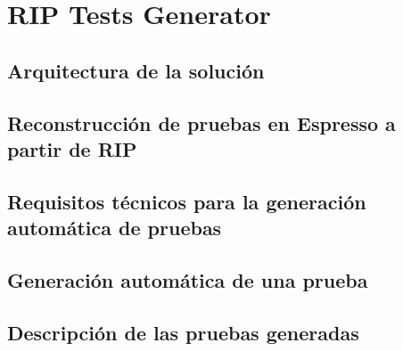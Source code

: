 \chapter{RIP Tests Generator}
\label{chapter3}

\section{Arquitectura de la solución}

\section{Reconstrucción de pruebas en Espresso a partir de RIP}

\section{Requisitos técnicos para la generación automática de pruebas}

\section{Generación automática de una prueba}

\section{Descripción de las pruebas generadas}
	
